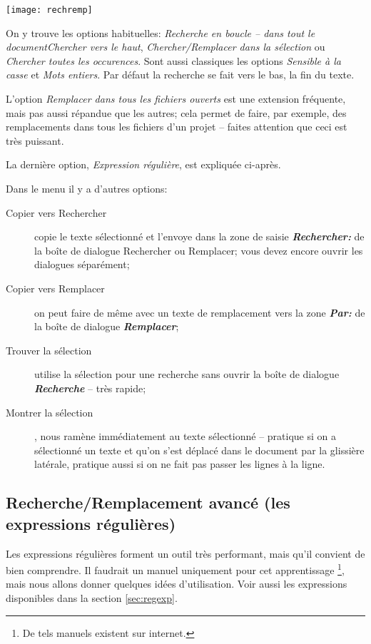 \begin{center}
\texttt{[image: rechremp]}
\end{center}

On y trouve les options habituelles:  \emph{Recherche en boucle -- dans tout le document}\emph{Chercher vers le haut}, \emph{Chercher/Remplacer dans la sélection} ou \emph{Chercher toutes les occurences}. Sont aussi classiques les options \emph{Sensible à la casse} et \emph{Mots entiers}. Par défaut la recherche se fait vers le bas, la fin du texte.

L'option \emph{Remplacer dans tous les fichiers ouverts} est une extension fréquente, mais pas aussi répandue que les autres; cela permet de faire, par exemple, des remplacements dans tous les fichiers d'un projet -- faites attention que ceci est très puissant.

La dernière option, \emph{Expression régulière}, est expliquée ci-après.

Dans le menu  il y a d'autres options:
\begin{description}
\item[Copier vers Rechercher] copie le texte sélectionné et l'envoye dans la zone de saisie \textsl{\textbf{Rechercher:}} de la boîte de dialogue Rechercher ou Remplacer; vous devez encore ouvrir les dialogues séparément;
\item[Copier vers Remplacer] on peut faire de même avec un texte de remplacement vers la zone \textsl{\textbf{Par:}} de la boîte de dialogue \textsl{\textbf{Remplacer}};
\item[Trouver la sélection] utilise la sélection pour une recherche sans ouvrir la boîte de dialogue  \textsl{\textbf{Recherche}} -- très rapide;
\item[Montrer la sélection], nous ramène immédiatement au texte sélectionné -- pratique si on a sélectionné un texte et qu'on s'est déplacé dans le document par la glissière latérale,  pratique aussi si on ne fait pas passer les lignes à la ligne.
\end{description}

\subsection{Recherche/Remplacement avancé (les expressions régulières)}

Les expressions régulières forment un outil très performant, mais qu'il convient de bien comprendre. Il faudrait un manuel uniquement pour cet apprentissage \footnote{De tels manuels existent sur internet.}, mais nous allons donner quelques idées d'utilisation. Voir aussi les expressions disponibles dans la section \ref{sec:regexp}.

